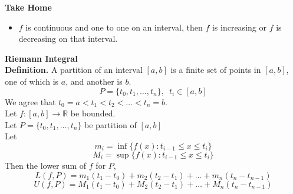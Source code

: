 \documentclass[10pt,letterpaper]{article}
\begin{document}
	\textbf{Take Home}
	\begin{itemize}
		\item $f$ is continuous and one to one on an interval, then $f$ is increasing
		or $f$ is decreasing on that interval.
	\end{itemize}

	
	\textbf{{\color{cyan}Riemann Integral}} \\
	\textbf{Definition. } A partition of an interval $[a, b]$ is a finite
	set of points in $[a, b]$, one of which is $a$, and another is $b$.
	$$P = \{t_0, t_1, \ldots, t_n\}, \, \, \, t_i \in [a, b]$$
	We agree that $t_0 = a < t_1 < t_2 < \ldots < t_n = b$. \\
	Let $f: [a, b] \rightarrow \mathbb{R}$ be bounded. \\
	Let $P = \{t_0, t_1, \ldots, t_n\}$ be partition of $[a, b]$ \\
	Let 
	$$m_i = \inf\{f(x) : t_{i-1} \leq x \leq t_i\}$$
	$$M_i = \sup\{f(x) : t_{i-1} \leq x \leq t_i\}$$
	Then the lower sum of $f$ for $P$,
	$$L(f, P) = m_1(t_1 - t_0) + m_2(t_2 - t_1) + \ldots + m_n(t_n - t_{n-1})$$
	$$U(f, P) = M_1(t_1 - t_0) + M_2(t_2 - t_1) + \ldots + M_n(t_n - t_{n-1})$$
	
\end{document}
